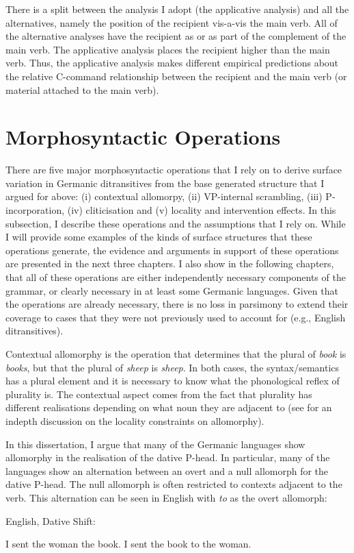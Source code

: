 There is a split between the analysis I adopt (the applicative analysis) and all the alternatives, namely the position of the recipient vis-a-vis the main verb. All of the alternative analyses have the recipient as or as part of the complement of the main verb. The applicative analysis places the recipient higher than the main verb. Thus, the applicative analysis makes different empirical predictions about the relative C-command relationship between the recipient and the main verb (or material attached to the main verb).

\section{Morphosyntactic Operations}
There are five major morphosyntactic operations that I rely on to derive surface variation in Germanic ditransitives from the base generated structure that I argued for above: (i) contextual allomorpy, (ii) VP-internal scrambling, (iii) P-incorporation, (iv) cliticisation and (v) locality and intervention effects. In this subsection, I describe these operations and the assumptions that I rely on. While I will provide some examples of the kinds of surface structures that these operations generate, the evidence and arguments in support of these operations are presented in the next three chapters. I also show in the following chapters, that all of these operations are either independently necessary components of the grammar, or clearly necessary in at least some Germanic languages. Given that the operations are already necessary, there is no loss in parsimony to extend their coverage to cases that they were not previously used to account for (e.g., English ditransitives).

Contextual allomorphy is the operation that determines that the plural of \textit{book} is \textit{books}, but that the plural of \textit{sheep} is \textit{sheep}. In both cases, the syntax/semantics has a plural element and it is necessary to know what the phonological reflex of plurality is. The contextual aspect comes from the fact that plurality has different realisations depending on what noun they are adjacent to (see \citealt{Embick.2010} for an indepth discussion on the locality constraints on allomorphy). 

In this dissertation, I argue that many of the Germanic languages show allomorphy in the realisation of the dative P-head. In particular, many of the languages show an alternation between an overt and a null allomorph for the dative P-head. The null allomorph is often restricted to contexts adjacent to the verb. This alternation can be seen in English with \textit{to} as the overt allomorph:
\begin{exe}
	\ex English, Dative Shift: \label{ex:dat-shift}
	\begin{xlist}
		\ex \label{ex:english-1} I sent the woman the book.
		\ex \label{ex:english-2} I sent the book to the woman.
	\end{xlist}
\end{exe}

